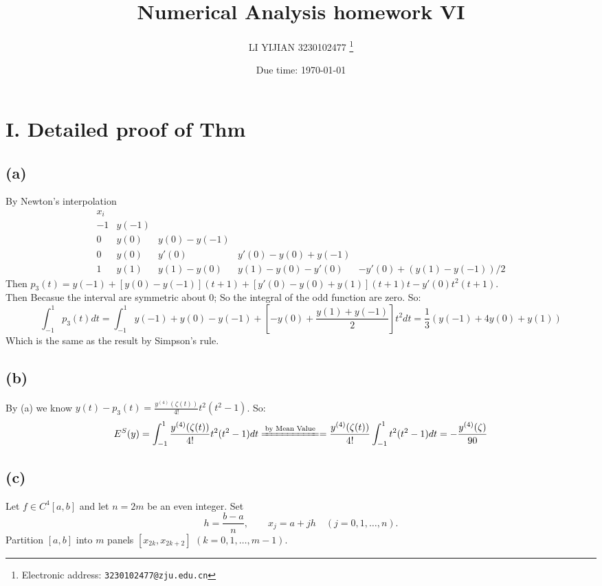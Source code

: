 \documentclass[a4paper]{article}
\begin{document}
\title{Numerical Analysis homework VI}

\author{LI YIJIAN 3230102477
  \thanks{Electronic address: \texttt{3230102477@zju.edu.cn}}}


\date{Due time: \today}
\maketitle





\section*{I. Detailed proof of Thm}
\subsection*{(a)}
By Newton's interpolation
\[
\renewcommand{\arraystretch}{1.25}
\begin{array}{c|c|c|c|c}
x_i
\\ \hline
-1 & y(-1) & & &  \\
0 & y(0) & y(0)-y(-1) & & \\
0 & y(0) & y'(0) & y'(0)-y(0)+y(-1) & \\
1 & y(1) & y(1)-y(0)& y(1)-y(0) -y'(0)& -y'(0) + (y(1)-y(-1))/2
\end{array}
\]
Then \(p_3(t) = y(-1) + [y(0)-y(-1)](t+1)+[y'(0)-y(0)+y(1)](t+1)t-y'(0)t^2(t+1)\).
\\
Then Becasue the interval are symmetric about 0; So the integral of the odd function
are zero.
So:
\[
\int_{-1}^{1}p_3(t)dt = \int_{-1}^{1}y(-1) + y(0)-y(-1) + [-y(0)+\frac{y(1) + y(-1)}{2}]t^2 dt
= \frac{1}{3}(y(-1) + 4y(0) + y(1))
\]
Which is the same as the result by Simpson's rule.
\subsection*{(b)}
By (a) we know \(y(t) - p_3(t) = \frac{y^{(4)}(\zeta(t))}{4!}t^2(t^2-1)\). 
So:
\[
E^{S}(y) = \int_{-1}^{1}\frac{y^{(4)}(\zeta(t))}{4!}t^2(t^2-1) dt \xlongequal{\text{by Mean Value}}
= \frac{y^{(4)}(\zeta(t))}{4!}\int_{-1}^{1}t^2(t^2-1) dt = -\frac{y^{(4)}(\zeta)}{90}
\]
\subsection*{(c)}
Let $f\in C^{4}[a,b]$ and let $n=2m$ be an even integer. Set
\[
h=\frac{b-a}{n},\qquad x_j=a+jh\quad (j=0,1,\dots,n).
\]
Partition $[a,b]$ into $m$ panels $[x_{2k},x_{2k+2}]$ $(k=0,1,\dots,m-1)$.
\end{document}
